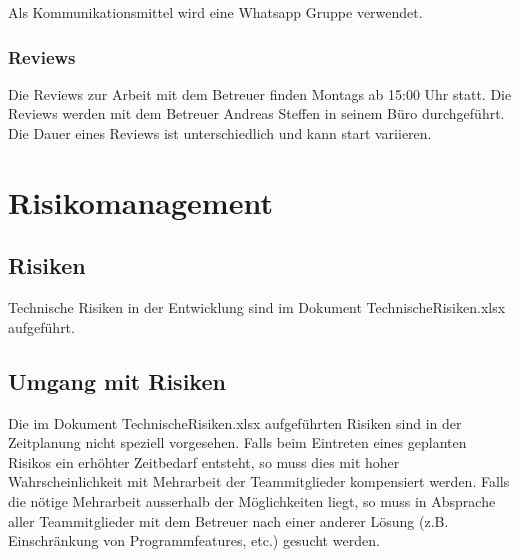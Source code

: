 \documentclass[a4,12pt]{scrartcl}
\begin{document}
Als Kommunikationsmittel wird eine Whatsapp Gruppe verwendet. 

\subsubsection{Reviews}
Die Reviews zur Arbeit mit dem Betreuer finden Montags ab 15:00 Uhr statt. 
Die Reviews werden mit dem Betreuer Andreas Steffen in seinem Büro durchgeführt. Die Dauer eines Reviews ist unterschiedlich und kann start variieren. 

\section{Risikomanagement}
\subsection{Risiken}
Technische Risiken in der Entwicklung sind im Dokument TechnischeRisiken.xlsx aufgeführt.
\subsection{Umgang mit Risiken}
Die im Dokument TechnischeRisiken.xlsx aufgeführten Risiken sind in der Zeitplanung nicht speziell vorgesehen. Falls beim Eintreten eines geplanten Risikos ein erhöhter Zeitbedarf entsteht, so muss dies mit hoher Wahrscheinlichkeit mit Mehrarbeit der Teammitglieder kompensiert werden. Falls die nötige Mehrarbeit ausserhalb der Möglichkeiten liegt, so muss in Absprache aller Teammitglieder mit dem Betreuer nach einer anderer Lösung (z.B. Einschränkung von Programmfeatures, etc.) gesucht werden.
\end{document}
